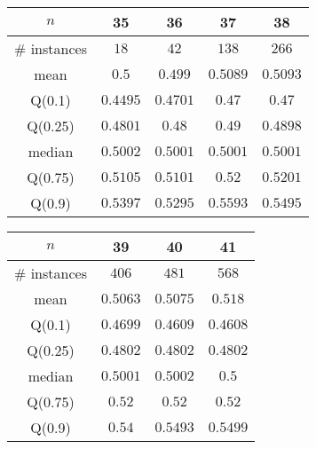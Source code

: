 \begin{tabular}{c|cccc} 
\hline 
$n$ & 35 & 36 & 37 & 38 \tabularnewline 
\hline 
\hline 
\# instances & $18$ & $42$ & $138$ & $266$ \tabularnewline 
mean & $0.5$ & $0.499$ & $0.5089$ & $0.5093$ \tabularnewline 
Q(0.1) & $0.4495$ & $0.4701$ & $0.47$ & $0.47$ \tabularnewline 
Q(0.25) & $0.4801$ & $0.48$ & $0.49$ & $0.4898$ \tabularnewline 
median & $0.5002$ & $0.5001$ & $0.5001$ & $0.5001$ \tabularnewline 
Q(0.75) & $0.5105$ & $0.5101$ & $0.52$ & $0.5201$ \tabularnewline 
Q(0.9) & $0.5397$ & $0.5295$ & $0.5593$ & $0.5495$ \tabularnewline 
\hline 
\end{tabular} 
\medskip{} 

\begin{tabular}{c|ccc} 
\hline 
$n$ & 39 & 40 & 41 \tabularnewline 
\hline 
\hline 
\# instances & $406$ & $481$ & $568$ \tabularnewline 
mean & $0.5063$ & $0.5075$ & $0.518$ \tabularnewline 
Q(0.1) & $0.4699$ & $0.4609$ & $0.4608$ \tabularnewline 
Q(0.25) & $0.4802$ & $0.4802$ & $0.4802$ \tabularnewline 
median & $0.5001$ & $0.5002$ & $0.5$ \tabularnewline 
Q(0.75) & $0.52$ & $0.52$ & $0.52$ \tabularnewline 
Q(0.9) & $0.54$ & $0.5493$ & $0.5499$ \tabularnewline 
\hline 
\end{tabular} 
\medskip{} 


